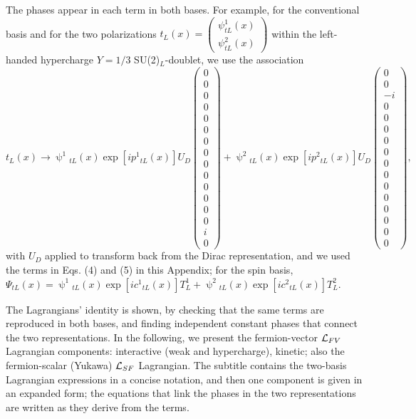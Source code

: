 \documentclass[12pt]{article}
\renewcommand\[{\begin{dmath}}
\renewcommand\]{\end{dmath}}
\begin{document}
The phases appear in each term in both bases. For example, for the conventional basis and for the two  polarizations   $     t_{L}(x)=\left(\begin{array}{lcr}
     \psi_{tL}^1(x) \\
  \psi_{tL}^2(x)
 \end{array}\right)$  within the   left-handed        hypercharge $Y =1/3$  SU(2)$_L$-doublet,
  we use the association
$t_{L}(x)\rightarrow \uppsi^1{} _{tL}(x)  \exp{[i p^1{}_{tL}(x)]} U_D \left(\begin{array}{lcr}
  0\\  0\\ 0\\ 0\\ 0\\ 0\\ 0\\ 0\\ 0\\ 0\\ 0\\ 0\\ 0\\ 0\\ i\\ 0
 \end{array}\right)+\uppsi^2{} _{tL}(x)  \exp{[i p^2{}_{tL}(x)]}U_D\left(\begin{array}{lcr}
  0\\  0\\ -i\\ 0\\ 0\\ 0\\ 0\\ 0\\ 0\\ 0\\ 0\\ 0\\ 0\\ 0\\ 0\\ 0
\end{array}\right),$ with  $U_D$   applied to transform back from the Dirac representation, and we used the terms in Eqs. (4) and (5) in this Appendix;
for  the spin basis,
${ \Psi_{tL} }(x)=  \uppsi^1{} _{tL}(x)  \exp{[i c^1{}_{tL}(x)]} T^1_L+ \uppsi^2{} _{tL}  (x)  \exp{[i c^2{}_{tL}(x)]} T^2_L $.

 The  Lagrangians' identity is shown, by checking that the same terms are reproduced in both bases, and finding independent  constant phases that connect the two representations.
In the following, we present   the  fermion-vector  ${\cal L}_{FV}$ Lagrangian components:    interactive (weak and hypercharge),   kinetic; also the fermion-scalar  (Yukawa)   ${\cal L}_{SF}$    Lagrangian. The subtitle contains the two-basis Lagrangian expressions in  a concise notation, and then   one component is given in an expanded form;     the equations that link the phases in  the two representations are written as they derive from the terms.
\end{document}
